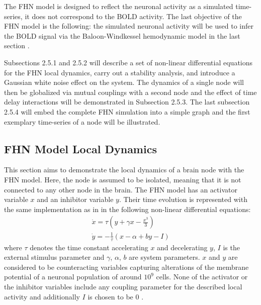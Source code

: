 The FHN model is designed to reflect the neuronal activity as a simulated time-series, it does not correspond to the BOLD activity. The last objective of the FHN model is the following: the simulated neuronal activity will be used to infer the BOLD signal via the Baloon-Windkessel hemodynamic model in the last section \citep{FRI00}. 

Subsections 2.5.1 and 2.5.2 will describe a set of non-linear differential equations for the FHN local dynamics, carry out a stability analysis, and introduce a Gaussian white noise effect on the system. The dynamics of a single node will then be globalized via mutual couplings with a second node and the effect of time delay interactions will be demonstrated in Subsection 2.5.3. The last subsection 2.5.4 will embed the complete FHN simulation into a simple graph and the first exemplary time-series of a node will be illustrated. 





\subsection{FHN Model Local Dynamics}

This section aims to demonstrate the local dynamics of a brain node with the FHN model. Here, the node is assumed to be isolated, meaning that it is not connected to any other node in the brain. The FHN model has an activator variable $x$ and an inhibitor variable $y$. Their time evolution is represented with the same implementation as in \citep{GHO08, GHO08a} in the following non-linear differential equations:
\begin{subequations}
\begin{align}\dot{x} = \tau (y + \gamma x - \frac{x^3}{3})  \label{eqn: frobenius 1}\\  \dot{y} = -\frac{1}{\tau} (x - \alpha + b y - I ) \label{eqn: frobenius 2}   \end{align} 
\end{subequations}
where $\tau$ denotes the time constant accelerating $x$ and decelerating $y$, $I$ is the external stimulus parameter and $\gamma$, $\alpha$, $b$ are system parameters. $x$ and $y$ are considered to be counteracting variables capturing alterations of the membrane potential of a neuronal population of around $10^9$ cells. None of the activator or the inhibitor variables include any coupling parameter for the described local activity and additionally $I$ is chosen to be 0 \citep{GHO08}.

